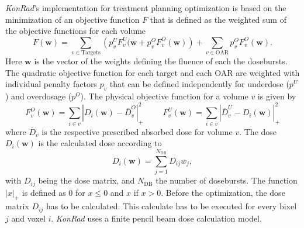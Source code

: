 \textit{KonRad}'s implementation for treatment planning optimization is based on the minimization of an objective function $F$ that is defined as the weighted sum of the objective functions for each volume
\begin{equation}
F(\mathbf{w}) = \sum\limits_{v\in\mathrm{Targets}}\left(p_v^UF_v^U(\mathbf{w}+p_v^OF_v^O(\mathbf{w})\right) + \sum\limits_{v\in\mathrm{OAR}}p_v^OF_v^O(\mathbf{w}).
\end{equation}
Here $\mathbf{w}$ is the vector of the weights defining the fluence of each the dosebursts. The quadratic objective function for each target and each OAR are weighted with individual penalty factors $p_v$ that can be defined independently for underdose ($p^U$) and overdosage ($p^O$). The physical objective function for a volume $v$ is given by \cite{pmid11444513}
\begin{equation}
F_v^O (\mathbf{w}) = \sum\limits_{i\in v} \left|D_i(\mathbf{w})-\overline{D}_v^O\right|_+^2\hspace{1cm}F_v^U (\mathbf{w}) = \sum\limits_{i\in v} \left|\overline{D}_v^U-D_i(\mathbf{w})\right|_+^2
\end{equation}
where $\overline{D}_v$ is the respective prescribed absorbed dose for volume $v$. The dose $D_i(\mathbf{w})$ is the calculated dose according to
\begin{equation}
D_i(\mathbf{w}) = \sum\limits_{j=1}^{N_{\mathrm{DB}}} D_{ij}w_j,
\end{equation}
with $D_{ij}$ being the dose matrix, and $N_{\mathrm{DB}}$ the number of dosebursts. The function $|x|_+$ is defined as 0 for $x\leq0$ and $x$ if $x>0$. Before the optimization, the dose matrix $D_{ij}$ has to be calculated. This calculate has to be executed for every bixel $j$ and voxel $i$. \textit{KonRad} uses a finite pencil beam dose calculation model\cite{nill}.
